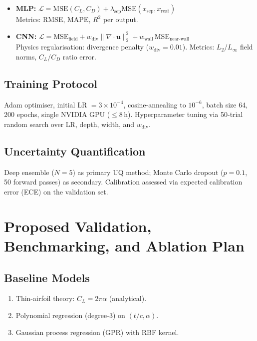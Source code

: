 \documentclass[11pt,a4paper]{article}
\begin{document}
\begin{itemize}
  \item \textbf{MLP:} $\mathcal{L} = \text{MSE}(C_L,C_D) + \lambda_\text{sep}
    \text{MSE}(x_\text{sep},x_\text{reat})$ \\
    Metrics: RMSE, MAPE, $R^2$ per output.
  \item \textbf{CNN:} $\mathcal{L} = \text{MSE}_\text{field} + w_\text{div}
    \|\nabla\cdot\mathbf{u}\|_2^2 + w_\text{wall}\,\text{MSE}_\text{near-wall}$ \\
    Physics regularisation: divergence penalty ($w_\text{div} = 0.01$).
    Metrics: $L_2$/$L_\infty$ field norms, $C_L$/$C_D$ ratio error.
\end{itemize}

\subsection{Training Protocol}

Adam optimiser, initial LR $= 3\times10^{-4}$, cosine-annealing to $10^{-6}$,
batch size 64, 200 epochs, single NVIDIA GPU ($\le 8$\,h).
Hyperparameter tuning via 50-trial random search over LR, depth, width, and
$w_\text{div}$.

\subsection{Uncertainty Quantification}

Deep ensemble ($N=5$) as primary UQ method; Monte Carlo dropout ($p=0.1$,
50 forward passes) as secondary. Calibration assessed via expected
calibration error (ECE) on the validation set.

\section{Proposed Validation, Benchmarking, and Ablation Plan}
\label{sec:ablation}

\subsection{Baseline Models}

\begin{enumerate}
  \item Thin-airfoil theory: $C_L = 2\pi\alpha$ (analytical).
  \item Polynomial regression (degree-3) on $(t/c, \alpha)$.
  \item Gaussian process regression (GPR) with RBF kernel.
\end{enumerate}
\end{document}
